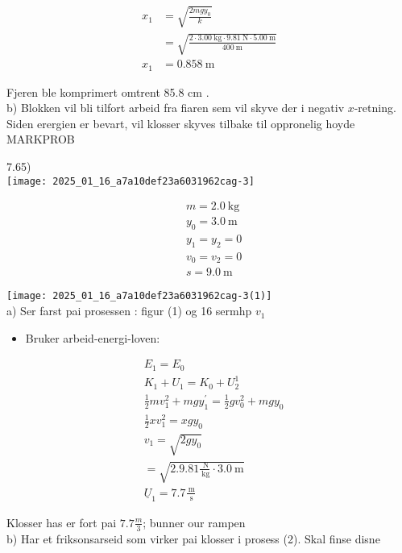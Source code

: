 \documentclass[10pt]{article}
\begin{document}
$$
\begin{aligned}
x_{1} & =\sqrt{\frac{2 m g y_{0}}{k}} \\
& =\sqrt{\frac{2 \cdot 3.00 \mathrm{~kg} \cdot 9.81 \mathrm{~N} \cdot 5.00 \mathrm{~m}}{400 \mathrm{~m}}} \\
x_{1} & =0.858 \mathrm{~m}
\end{aligned}
$$

Fjeren ble komprimert omtrent 85.8 cm .\\
b) Blokken vil bli tilfort arbeid fra fiaren sem vil skyve der i negativ $x$-retning. Siden erergien er bevart, vil klosser skyves tilbake til oppronelig hoyde\\

MARKPROB

7.65)\\
\texttt{[image: 2025\_01\_16\_a7a10def23a6031962cag-3]}

$$
\begin{aligned}
& m=2.0 \mathrm{~kg} \\
& y_{0}=3.0 \mathrm{~m} \\
& y_{1}=y_{2}=0 \\
& v_{0}=v_{2}=0 \\
& s=9.0 \mathrm{~m}
\end{aligned}
$$

\texttt{[image: 2025\_01\_16\_a7a10def23a6031962cag-3(1)]}\\
a) Ser farst pai prosessen : figur (1) og 16 sermhp $v_{1}$

\begin{itemize}
  \item Bruker arbeid-energi-loven:
\end{itemize}

$$
\begin{aligned}
& E_{1}=E_{0} \\
& K_{1}+U_{1}=K_{0}+U_{2}^{1} \\
& \frac{1}{2} m v_{1}^{2}+m g y_{1}^{\prime}=\frac{1}{2} g v_{0}^{2}+m g y_{0} \\
& \frac{1}{2} x v_{1}^{2}=x g y_{0} \\
& v_{1}=\sqrt{2 g y_{0}} \\
& =\sqrt{2.9 .81 \frac{\mathrm{~N}}{\mathrm{~kg}} \cdot 3.0 \mathrm{~m}} \\
& \underline{U}_{1}=7.7 \frac{\mathrm{~m}}{\mathrm{~s}}
\end{aligned}
$$

Klosser has er fort pai $7.7 \frac{m}{3}$; bunner our rampen\\
b) Har et friksonsarseid som virker pai klosser i prosess (2). Skal finse disne
\end{document}

